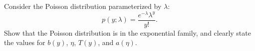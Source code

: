 \item {} Consider the Poisson distribution parameterized by
$\lambda$:
%
\begin{equation*}
  p(y; \lambda) = \frac{e^{-\lambda}\lambda^y}{y!}.
\end{equation*}
%
Show that the Poisson distribution is in the exponential family, and
clearly state the values for $b(y)$, $\eta$, $T(y)$, and $a(\eta)$.

\ifnum{}\fi
